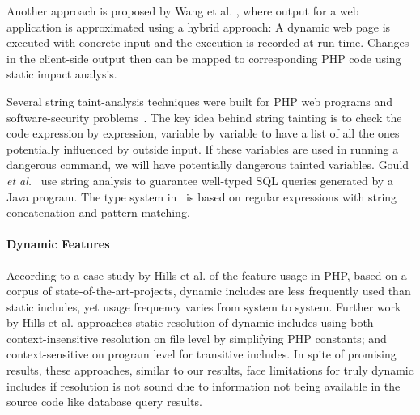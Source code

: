 Another approach is proposed by Wang et al. \cite{wang_automating_2012}, where
output for a web application is approximated using a hybrid approach: A
dynamic web page is executed with concrete input and the execution is
recorded at run-time. Changes in the client-side output then can be mapped to 
corresponding PHP code using static impact analysis.


Several string taint-analysis techniques were built for PHP web
programs and software-security
problems~\cite{kieyzun09,su-icse08,xieaiken06,tevfik11}.  The key idea
behind string tainting is to check the code expression by expression,
variable by variable to have a list of all the ones potentially
influenced by outside input.  If these variables are used in running a
dangerous command, we will have potentially dangerous tainted
variables.
%
Gould {\em et al.}~\cite{gould04} use string analysis to guarantee
well-typed SQL queries generated by a Java program. The type system
in~\cite{tabuchi03} is based on regular expressions with string
concatenation and pattern matching.  


\paragraph{Dynamic Features}
According to a case study by Hills et al. \cite{Hills:2013:ESP:2483760.2483786}
of the feature usage in PHP, based on a corpus of state-of-the-art-projects,
dynamic includes are less frequently used than static includes, yet usage
frequency varies from system to system. Further work by Hills et al.
\cite{hills2014static,hills2014php} approaches static resolution of dynamic includes using
both context-insensitive resolution on file level by simplifying PHP constants;
and context-sensitive on program level for transitive includes. In spite of 
promising results, these approaches, similar to our results, face limitations
for truly dynamic includes if resolution is not sound due to information not
being available in the source code like database query results.

